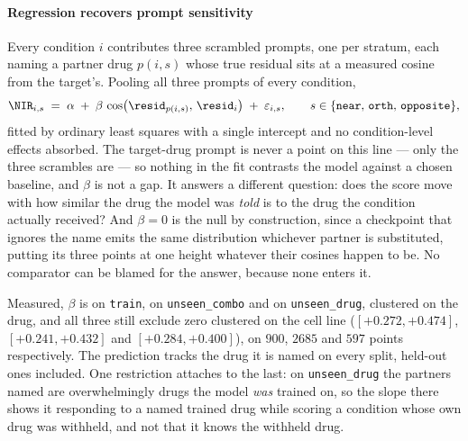 \paragraph{Regression recovers prompt sensitivity} 

Every condition $i$ contributes three scrambled prompts, one per stratum,
each naming a partner drug $p(i,s)$ whose true residual sits at a measured cosine
from the target's. Pooling all three prompts of every condition,
\begin{equation}
 \NIR_{i,s} \;=\; \alpha \;+\; \beta\,
   \cos\!\big(\resid_{p(i,s)},\, \resid_{i}\big) \;+\; \varepsilon_{i,s},
 \qquad s \in \{\texttt{near},\, \texttt{orth},\, \texttt{opposite}\},
\end{equation}
fitted by ordinary least squares with a single intercept and no condition-level
effects absorbed. The target-drug prompt is never a point on this line --- only
the three scrambles are --- so nothing in the fit contrasts the model against a
chosen baseline, and $\beta$ is not a gap. It answers a different question: does
the score move with how similar the drug the model was \emph{told} is to the drug
the condition actually received? And $\beta = 0$ is the null by construction, since
a checkpoint that ignores the name emits the same distribution whichever partner
is substituted, putting its three points at one height whatever their cosines
happen to be. No comparator can be blamed for the answer, because none enters it.

Measured, $\beta$ is  on \texttt{train},
 on \texttt{unseen\_combo} and
 on \texttt{unseen\_drug}, clustered on the drug, and
all three still exclude zero clustered on the cell line ($[+0.272, +0.474]$,
$[+0.241, +0.432]$ and $[+0.284, +0.400]$), on $900$, $\num{2685}$ and $597$
points respectively. The prediction tracks the drug it is named on every split,
held-out ones included. One restriction attaches to the last: on
\texttt{unseen\_drug} the partners named are overwhelmingly drugs the model
\emph{was} trained on, so the slope there shows it responding to a named trained
drug while scoring a condition whose own drug was withheld, and not that it knows
the withheld drug.


